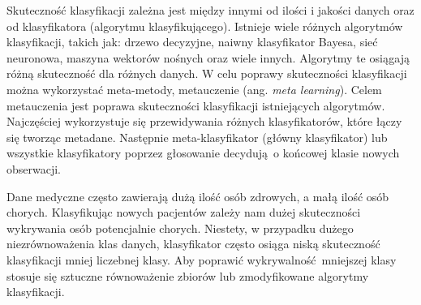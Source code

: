 Skuteczność klasyfikacji zależna jest między innymi od ilości i jakości danych oraz od klasyfikatora (algorytmu klasyfikującego). Istnieje wiele różnych algorytmów klasyfikacji, takich jak: drzewo decyzyjne, naiwny klasyfikator Bayesa, sieć neuronowa, maszyna wektorów nośnych oraz wiele innych. Algorytmy te osiągają różną skuteczność dla różnych danych. W celu poprawy skuteczności klasyfikacji można wykorzystać meta-metody, metauczenie (ang. \textit{meta learning}). Celem metauczenia jest poprawa skuteczności klasyfikacji istniejących algorytmów. Najczęściej wykorzystuje się przewidywania różnych klasyfikatorów, które łączy się tworząc metadane. Następnie meta-klasyfikator (główny klasyfikator) lub wszystkie klasyfikatory poprzez głosowanie decydują o końcowej klasie nowych obserwacji. 	\par 
Dane medyczne często zawierają dużą ilość osób zdrowych, a małą ilość osób chorych. Klasyfikując nowych pacjentów zależy nam dużej skuteczności wykrywania osób potencjalnie chorych. Niestety, w przypadku dużego niezrównoważenia klas danych, klasyfikator często osiąga niską skuteczność klasyfikacji mniej liczebnej klasy. Aby poprawić wykrywalność mniejszej klasy stosuje się sztuczne równoważenie zbiorów lub zmodyfikowane algorytmy klasyfikacji.